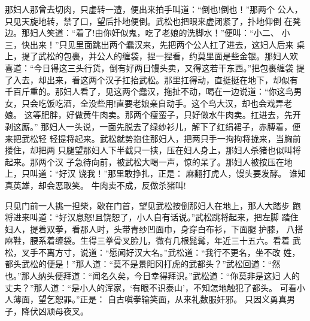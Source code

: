 那妇人那曾去切肉，只虚转一遭，便出来拍手叫道：“倒也!倒也！”那两个
公人，只见天旋地转，禁了口，望后扑地便倒。武松也把眼来虚闭紧了，扑地仰倒
在凳边。那妇人笑道：“着了!由你奸似鬼，吃了老娘的洗脚水！”便叫：“小二、
小三，快出来！”只见里面跳出两个蠢汉来，先把两个公人扛了进去，这妇人后来
桌上，提了武松的包裹，并公人的缠袋，捏一捏看，约莫里面是些金银。那妇人欢
喜道：“今日得这三头行货，倒有好两日馒头卖，又得这若干东西。”把包裹缠袋
提了入去，却出来，看这两个汉子扛抬武松。那里扛得动，直挺挺在地下，却似有
千百斤重的。那妇人看了，见这两个蠢汉，拖扯不动，喝在一边说道：“你这鸟男
女，只会吃饭吃酒，全没些用!直要老娘亲自动手。这个鸟大汉，却也会戏弄老娘。
这等肥胖，好做黄牛肉卖。那两个瘦蛮子，只好做水牛肉卖。扛进去，先开剥这厮。”
那妇人一头说，一面先脱去了绿纱衫儿，解下了红绢裙子，赤膊着，便来把武松轻
轻提将起来。武松就势抱住那妇人，把两只手一拘拘将拢来，当胸前搂住，却把两
只腿望那妇人下半截只一挟，压在妇人身上，那妇人杀猪也似叫将起来。那两个汉
子急待向前，被武松大喝一声，惊的呆了。那妇人被按压在地上，只叫道：“好汉
饶我！”那里敢挣扎，正是：
麻翻打虎人，馒头要发酵。
谁知真英雄，却会恶取笑。
牛肉卖不成，反做杀猪叫!

只见门前一人挑一担柴，歇在门首，望见武松按倒那妇人在地上，那人大踏步
跑将进来叫道：“好汉息怒!且饶恕了，小人自有话说。”武松跳将起来，把左脚
踏住妇人，提着双拳，看那人时，头带青纱凹面巾，身穿白布衫，下面腿护膝，
八搭麻鞋，腰系着缠袋。生得三拳骨叉脸儿，微有几根髭髯，年近三十五六。看着
武松，叉手不离方寸，说道：“愿闻好汉大名。”武松道：“我行不更名，坐不改
姓，都头武松的便是！”那人道：“莫不是景阳冈打虎的武都头？”武松回道：“然
也。”那人纳头便拜道：“闻名久矣，今日幸得拜识。”武松道：“你莫非是这妇
人的丈夫？”那人道：“是小人的浑家，‘有眼不识泰山’，不知怎地触犯了都头。
可看小人薄面，望乞恕罪。”正是：
自古嗔拳输笑面，从来礼数服奸邪。
只因义勇真男子，降伏凶顽母夜叉。

